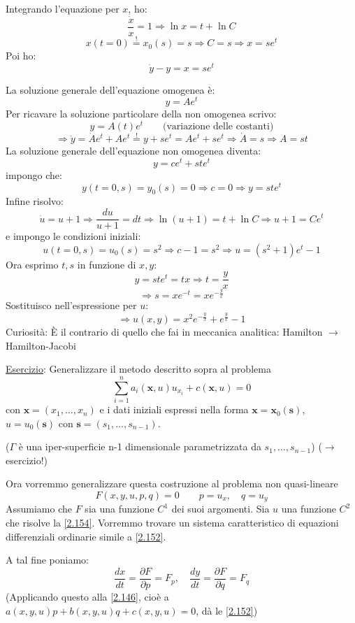 \documentclass[a4paper,11pt]{report}
\newcommand{\vect}[1]{\boldsymbol{#1}}
\newcommand{\x}{\boldsymbol{x}}
\begin{document}
Integrando l'equazione per $x$, ho:
\[
\frac{\dot{x}}{x}=1 \Rightarrow \ln x = t + \ln C
\]
\[
x(t=0)\overset{!}{=}x_0(s) =s \Rightarrow C=s \Rightarrow x=se^t
\]
Poi ho:
\[
\dot{y}-y=x=se^t
\]

La soluzione generale dell'equazione omogenea \`e:
\[
y=Ae^t
\]
Per ricavare la soluzione particolare della non omogenea scrivo:
 \[
 y=A(t)e^t \qquad \text{(variazione delle costanti)}
 \]
 \[
 \Rightarrow \dot{y}=\dot{A}e^t + Ae^t \overset{!}{=} y+se^t = Ae^t + se^t \Rightarrow \dot{A}=s \Rightarrow A=st
 \]
La soluzione generale dell'equazione non omogenea diventa:
\[
y=ce^t + st e^t
\]
impongo che:
\[
y(t=0,s)=y_0(s)=0 \Rightarrow c=0 \Rightarrow y=ste^t
\]
Infine risolvo:
\[
\dot{u}=u+1\Rightarrow \frac{du}{u+1}=dt \Rightarrow \ln(u+1)=t+\ln C \Rightarrow u+1 = Ce^t
\]
e impongo le condizioni iniziali:
\[
u(t=0,s)=u_0(s)=s^2 \Rightarrow c-1=s^2 \Rightarrow u=(s^2 + 1)e^t -1
\]
Ora esprimo $t,s$ in funzione di $x,y$: 
\[
y=ste^t =tx \Rightarrow t=\frac{y}{x}
\]
\[
\Rightarrow s=xe^{-t}=xe^{-\frac{y}{x}}
\]
Sostituisco nell'espressione per $u$:
\[
\Rightarrow u(x,y)=x^2e^{-\frac{y}{x}}+e^{\frac{y}{x}}-1
\]
Curiosit\`a: \`E il contrario di quello che fai in meccanica analitica: Hamilton $\rightarrow$ Hamilton-Jacobi

\medskip

\underline{Esercizio}: Generalizzare il metodo descritto sopra al problema
\[
\sum_{i=1}^n a_i(\x,u)u_{x_i} + c(\x,u)=0
\]
con $\x = (x_1,\ldots,x_n)$ e i dati iniziali espressi nella forma $\x=\x_0(\vect{s})$, $u=u_0(\vect{s})$ con $\vect{s}=(s_1,\ldots,s_{n-1})$. 

($\Gamma$ \`e una iper-superficie n-1 dimensionale parametrizzata da $s_1,\ldots,s_{n-1}$) ($\rightarrow$ esercizio!)

\medskip

Ora vorremmo generalizzare questa costruzione al problema non quasi-lineare
\begin{equation}
F(x,y,u,p,q)=0 \qquad p=u_x,\quad q=u_y
\label{2.154}
\end{equation}
Assumiamo che $F$ sia una funzione $C^1$ dei suoi argomenti.
Sia $u$ una funzione $C^2$ che risolve la \eqref{2.154}.
Vorremmo trovare un sistema caratteristico di equazioni differenziali ordinarie simile a \eqref{2.152}.

A tal fine poniamo:
\begin{equation}
\frac{dx}{dt}=\frac{\partial F}{\partial p}=F_p, \quad \frac{dy}{dt}=\frac{\partial F}{\partial q}=F_q
\label{2.155}
\end{equation}
(Applicando questo alla \eqref{2.146}, cio\`e a $a(x,y,u)p + b(x,y,u)q + c(x,y,u)=0$, d\`a le \eqref{2.152})
\end{document}
